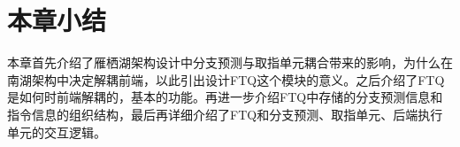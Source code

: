 







\section{本章小结}

本章首先介绍了雁栖湖架构设计中分支预测与取指单元耦合带来的影响，为什么在南湖架构中决定解耦前端，以此引出设计FTQ这个模块的意义。之后介绍了FTQ是如何时前端解耦的，基本的功能。再进一步介绍FTQ中存储的分支预测信息和指令信息的组织结构，最后再详细介绍了FTQ和分支预测、取指单元、后端执行单元的交互逻辑。

